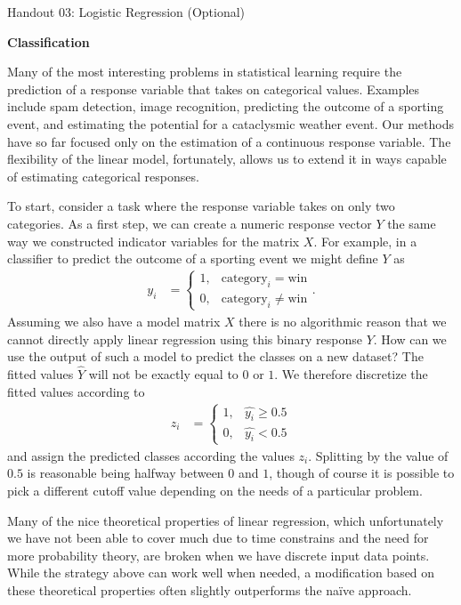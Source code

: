 \documentclass[12pt,hidelinks]{article}
\numberwithin{equation}{section}
\begin{document}
{\LARGE Handout 03: Logistic Regression (Optional)}

\vspace*{18pt}


\textbf{Classification}

Many of the most interesting problems in statistical learning
require the prediction of a response variable that takes on
categorical values. Examples include spam detection, image
recognition, predicting the outcome of a sporting event, and
estimating the potential for a cataclysmic weather event. Our
methods have so far focused only on the estimation of a
continuous response variable. The flexibility of the linear
model, fortunately, allows us to extend it in ways
capable of estimating categorical responses.

To start, consider a task where the response variable takes
on only two categories. As a first step, we can create a numeric
response vector $Y$ the same way we constructed indicator
variables for the matrix $X$. For example, in a classifier to
predict the outcome of a sporting event we might define $Y$ as
\begin{align}
y_i &= \begin{cases} 1, & \text{category}_i =
   \text{win} \\ 0, & \text{category}_i \neq \text{win} \end{cases}.
\end{align}
Assuming we also have a model matrix $X$ there is no algorithmic
reason that we cannot directly apply linear regression using this
binary response $Y$.
How can we use the output of such a model to predict the classes
on a new dataset? The fitted values $\widehat{Y}$ will not be
exactly equal to $0$ or $1$. We therefore discretize the fitted
values according to
\begin{align}
z_i &= \begin{cases} 1, & \widehat{y_i} \geq 0.5 \\
 0, & \widehat{y_i} < 0.5 \end{cases} \label{disc_response}
\end{align}
and assign the predicted classes according the values $z_i$.
Splitting by the value of $0.5$ is reasonable being halfway
between $0$ and $1$, though of course it is possible to pick a
different cutoff value depending on the needs of a particular
problem.

Many of the nice theoretical properties of linear regression,
which unfortunately we have not been able to cover much due
to time constrains and the need for more probability theory,
are broken when we have discrete input data points. While the
strategy above can work well when needed, a modification based
on these theoretical properties often slightly outperforms the
naïve approach.
\end{document}
